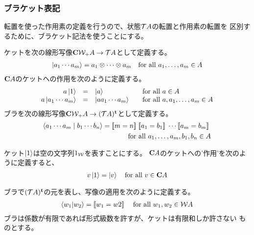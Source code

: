 \subsubsection{ブラケット表記}\label{s3:ブラケット表記} %
	転置を使った作用素の定義を行うので、状態${{\mathcal{T}}} A$の転置と作用素の転置を
	区別するために、ブラケット記法を使うことにする。
	
	ケットを次の線形写像$\mathbf{C}{{\mathcal{W}}}_+A\to{\ensuremath{{\mathcal{T}}}} A$として定義する。
	\begin{equation*}\begin{split}
		\mathinner{|{a_1\cdots a_m}\rangle} = a_1\otimes\cdots\otimes a_m
		\quad\text{for all }a_1,\dots,a_m\in A
	\end{split}\end{equation*}
	$\mathbf{C} A$のケットへの作用を次のように定義する。
	{\setlength\arraycolsep{2pt}
	\begin{equation*}\begin{array}{rcll}
		a\mathinner{|{1}\rangle} &=& \mathinner{|{a}\rangle} & \quad\text{for all } a\in A \\
		a\mathinner{|{a_1\cdots a_m}\rangle} &=& \mathinner{|{aa_1\cdots a_m}\rangle}
		& \quad\text{for all } a,a_1,\dots,a_m\in A
	\end{array}\end{equation*}
	}
	ブラを次の線形写像$\mathbf{C}{{\mathcal{W}}}_+A\to({{\mathcal{T}}} A)^{\mathbf{t}}$として定義する。
	\begin{equation*}\begin{split}
		\mathinner{\langle{a_1\cdots a_m\;\vert\;b_1\cdots b_n}\rangle} = 
		[\![m=n]\!]\;[\![a_1=b_1]\!]\;\cdots[\![a_m=b_m]\!]\; \\
		\quad\text{for all }a_1,\dots,a_m,b_1,b_n\in A
	\end{split}\end{equation*}

	ケット$\mathinner{|{1}\rangle}$は空の文字列$1_{{\mathcal{W}}}$を表すことにする。
	$\mathbf{C} A$のケットへの'作用'を次のように定義すると、
	\begin{equation*}\begin{split}
		v\mathinner{|{1}\rangle} = \mathinner{|{v}\rangle} \quad\text{for all } v\in \mathbf{C} A
	\end{split}\end{equation*}

	ブラで$({{\mathcal{T}}} A)^{\mathbf{t}}$の元を表し、写像の適用を次のように定義する。
	\begin{equation*}\begin{split}
		\mathinner{\langle{w_1|w_2}\rangle} &= [\![w_1 = w2]\!]\;
		\quad\text{for all } w_1,w_2\in {\ensuremath{{\mathcal{W}}}} A \\
	\end{split}\end{equation*}
	ブラは係数が有限であれば形式級数を許すが、ケットは有限和しか許さない
	ものとする。


